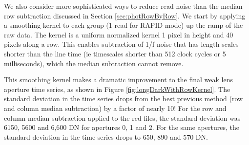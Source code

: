 \documentclass{aastex62}
\begin{document}
We also consider more sophisticated ways to reduce read noise than the median row subtraction discussed in Section \ref{sec:photRowByRow}.
We start by applying a smoothing kernel to each group (1 read for RAPID mode) up the ramp of the raw data.
The kernel is a uniform normalized kernel 1 pixel in height and 40 pixels along a row.
This enables subtraction of 1/f noise that has length scales shorter than the line time (ie timescales shorter than 512 clock cycles or 5 milliseconds), which the median subtraction cannot remove.

This smoothing kernel makes a dramatic improvement to the final weak lens aperture time series, as shown in Figure \ref{fig:longDarkWithRowKernel}.
The standard deviation in the time series drops from the best previous method (row and column median subtraction) by a factor of nearly 10!
For the row and column median subtraction applied to the red files, the standard deviation was 6150, 5600 and 6,600 DN for apertures 0, 1 and 2.
For the same apertures, the standard deviation in the time series drops to 650, 890 and 570 DN.
\end{document}
